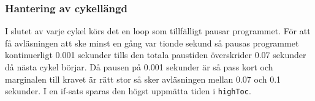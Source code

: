 \subsubsection{Hantering av cykellängd}
\label{sec:system:korning:cykel}
I slutet av varje cykel körs det en loop som tillfälligt pausar programmet.
För att få avläsningen att ske minst en gång var tionde sekund så pausas
programmet kontinuerligt 0.001 sekunder tills den totala paustiden överskrider 
0.07 sekunder då nästa cykel börjar. Då pausen på 0.001 sekunder är så pass
kort och marginalen till kravet är rätt stor så sker avläsningen mellan
0.07 och 0.1 sekunder. I en if-sats sparas den högst
uppmätta tiden i \texttt{highToc}.